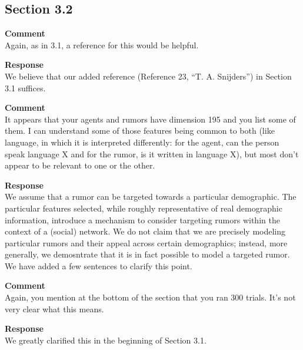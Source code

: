 \subsection{Section 3.2}
\setcounter{rev2-3.2}{1}

\textbf{Comment } \\
Again, as in 3.1, a reference for this would be helpful.

\textbf{Response } \\
We believe that our added reference (Reference 23, ``T. A. Snijders'') in Section 3.1 suffices.

\textbf{Comment } \\
It appears that your agents and rumors have dimension 195 and you list some of them.
I can understand some of those features being common to both (like language, in which it is interpreted differently: for the agent, can the person speak language X and for the rumor, is it written in language X), but most don't appear to be relevant to one or the other.

\textbf{Response } \\
We assume that a rumor can be targeted towards a particular demographic.
The particular features selected, while roughly representative of real demographic information, introduce a mechanism to consider targeting rumors within the context of a (social) network.
We do not claim that we are precisely modeling particular rumors and their appeal across certain demographics; instead, more generally, we demosntrate that it is in fact possible to model a targeted rumor.
We have added a few sentences to clarify this point.

\textbf{Comment } \\
Again, you mention at the bottom of the section that you ran 300 trials.
It's not very clear what this means.

\textbf{Response } \\
We greatly clarified this in the beginning of Section 3.1.
